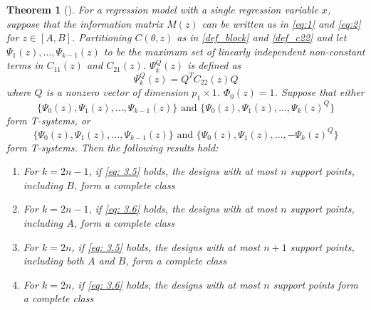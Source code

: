 \documentclass[12pt]{amsart}
\newtheorem{theorem}{Theorem}[section]
\theoremstyle{definition}
\theoremstyle{remark}
\numberwithin{equation}{section}
\begin{document}
\begin{theorem}[\cite{yang2012}]\label{2012a}
For a regression model with a single regression variable $x$, suppose that the information matrix $M(z)$ can be written as in \eqref{eq:1} and \eqref{eq:2} for $z\in[A,B]$. Partitioning $C(\theta,z)$ as in \eqref{def_block} and \eqref{def_c22} and let $\Psi_1(z),\ldots,\Psi_{k-1}(z)$ to be the maximum set of linearly independent non-constant terms in $C_{11}(z)$ and $C_{21}(z)$. $\Psi^Q_{k}(z)$ is defined as \[\Psi_k^Q(z) = Q^TC_{22}(z)Q\] where $Q$ is a nonzero vector of dimension $p_1\times 1$. $\Phi_0(z) = 1$.
Suppose that either \begin{equation}\label{eq: 3.5}
    \{\Psi_0(z),\Psi_1(z),\ldots, \Psi_{k-1}(z)\} \text{ and }  \{\Psi_0(z),\Psi_1(z),\ldots, \Psi_k(z)^Q\}
\end{equation} form T-systems, or\begin{equation}\label{eq: 3.6}
    \{\Psi_0(z),\Psi_1(z),\ldots,\Psi_{k-1}(z)\} \text{ and }  \{\Psi_0(z),\Psi_1(z),\ldots, -\Psi_k(z)^Q\} 
\end{equation}
     form T-systems. Then the following results hold:
\begin{enumerate}
    \item[(a)]  For $k=2n-1$, if \eqref{eq: 3.5} holds, the designs with at most $n$ support points, including $B$, form a complete class
    
      \item[(b)]  For $k=2n-1$, if \eqref{eq: 3.6} holds, the designs with at most $n$ support points, including $A$, form a complete class
      \item[(c)]  For $k=2n$, if \eqref{eq: 3.5} holds, the designs with at most $n+1$ support points, including both $A$ and $B$, form a complete class
      \item[(d)]  For $k=2n$, if \eqref{eq: 3.6} holds, the designs with at most $n$ support points form a complete class
    
\end{enumerate}
\end{theorem}
\end{document}
